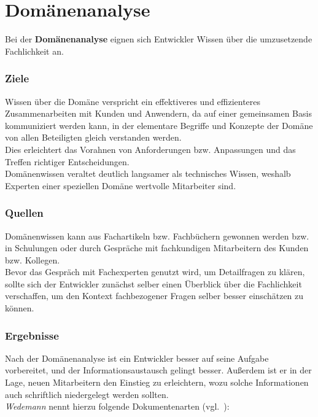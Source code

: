 \section{Domänenanalyse}\label{sec:domanenanalyse}

\noindent
Bei der \textbf{Domänenanalyse} eignen sich Entwickler Wissen über die umzusetzende Fachlichkeit an.\\

\subsubsection*{Ziele}
Wissen über die Domäne verspricht ein effektiveres und effizienteres Zusammenarbeiten mit Kunden und Anwendern, da auf einer gemeinsamen Basis kommuniziert werden kann, in der elementare Begriffe und Konzepte der Domäne von allen Beteiligten gleich verstanden werden.\\
Dies erleichtert das Vorahnen von Anforderungen bzw. Anpassungen und das Treffen richtiger Entscheidungen.\\
Domänenwissen veraltet deutlich langsamer als technisches Wissen, weshalb Experten einer speziellen Domäne wertvolle Mitarbeiter sind.\\

\subsubsection*{Quellen}
Domänenwissen kann aus Fachartikeln bzw. Fachbüchern gewonnen werden bzw. in Schulungen oder durch Gespräche mit fachkundigen Mitarbeitern des Kunden bzw. Kollegen.\\
Bevor das Gespräch mit Fachexperten genutzt wird, um Detailfragen zu klären, sollte sich der Entwickler zunächst selber einen Überblick über die Fachlichkeit verschaffen, um den Kontext fachbezogener Fragen selber besser einschätzen zu können.\\

\subsubsection*{Ergebnisse}
Nach der Domänenanalyse ist ein Entwickler besser auf seine Aufgabe vorbereitet, und der Informationsaustausch gelingt besser.
Außerdem ist er in der Lage, neuen Mitarbeitern den Einstieg zu erleichtern, wozu solche Informationen auch schriftlich niedergelegt werden sollten.\\
\textit{Wedemann} nennt hierzu folgende Dokumentenarten (vgl.~\cite[42]{Wed09}):


